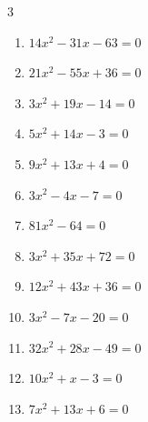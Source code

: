 \begin{multicols}{3}
\begin{enumerate}
  \item $14x^{2}-31x-63=0$


  \item $21x^{2}-55x+36=0$


  \item $3x^{2}+19x-14=0$


  \item $5x^{2}+14x-3=0$


  \item $9x^{2}+13x+4=0$


  \item $3x^{2}-4x-7=0$


  \item $81x^{2}-64=0$


\columnbreak %

  \item $3x^{2}+35x+72=0$


  \item $12x^{2}+43x+36=0$


  \item $3x^{2}-7x-20=0$


  \item $32x^{2}+28x-49=0$


  \item $10x^{2}+x-3=0$


  \item $7x^{2}+13x+6=0$


\end{enumerate}
\end{multicols}
